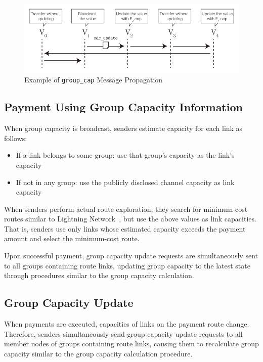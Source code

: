 \documentclass[conference]{IEEEtran}
\newcommand{\groupcap}{\texttt{group\_cap}}
\begin{document}
\begin{figure}[htbp]
	\centerline{\includegraphics[width=1\linewidth]{fig/group_cap_handover}}
	\caption{Example of \groupcap{} Message Propagation}
	\label{fig:group_cap_sequence}
\end{figure}

\subsection{Payment Using Group Capacity Information}

When group capacity is broadcast, senders estimate capacity for each link as follows:
\begin{itemize}
	\item If a link belongs to some group: use that group's capacity as the link's capacity
	\item If not in any group: use the publicly disclosed channel capacity as link capacity
\end{itemize}

When senders perform actual route exploration, they search for minimum-cost routes similar to Lightning Network~\cite{poon_dryja_2016,lnd,eclair,clightning}, but use the above values as link capacities. That is, senders use only links whose estimated capacity exceeds the payment amount and select the minimum-cost route.

Upon successful payment, group capacity update requests are simultaneously sent to all groups containing route links, updating group capacity to the latest state through procedures similar to the group capacity calculation.

\subsection{Group Capacity Update}

When payments are executed, capacities of links on the payment route change. Therefore, senders simultaneously send group capacity update requests to all member nodes of groups containing route links, causing them to recalculate group capacity similar to the group capacity calculation procedure.
\end{document}

